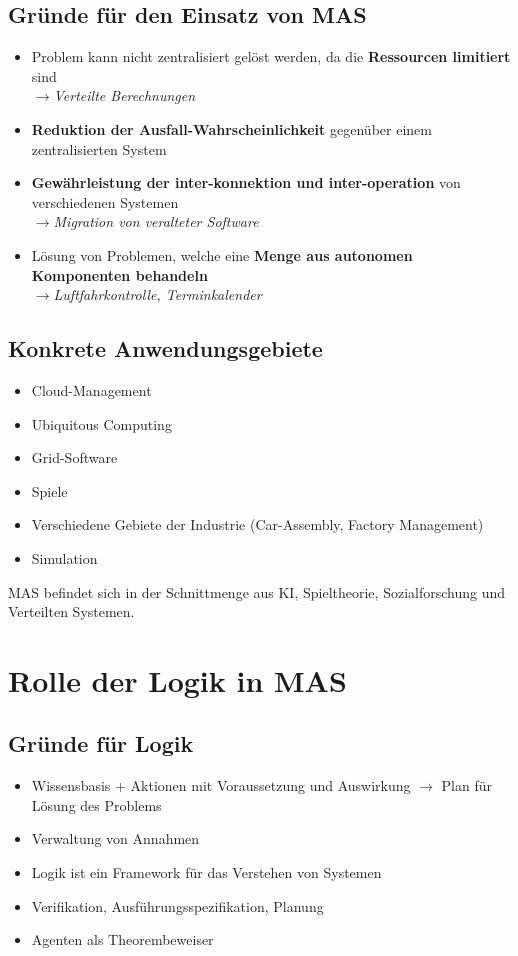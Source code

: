 \documentclass{article} %
\begin{document}
	\subsection{Gründe für den Einsatz von MAS}
	\begin{itemize}
		\item Problem kann nicht zentralisiert gelöst werden, da die \textbf{Ressourcen limitiert} sind\\
		$\rightarrow$\textit{Verteilte Berechnungen}
		\item \textbf{Reduktion der Ausfall-Wahrscheinlichkeit} gegenüber einem zentralisierten System
		\item \textbf{Gewährleistung der inter-konnektion und inter-operation} von verschiedenen Systemen\\
		$\rightarrow$\textit{Migration von veralteter Software}
		\item Lösung von Problemen, welche eine\textbf{ Menge aus autonomen Komponenten behandeln}\\
		$\rightarrow$\textit{Luftfahrkontrolle, Terminkalender}
	\end{itemize}
	\subsection{Konkrete Anwendungsgebiete}
	\begin{itemize}
		\item Cloud-Management
		\item Ubiquitous Computing
		\item Grid-Software
		\item Spiele
		\item Verschiedene Gebiete der Industrie (Car-Assembly, Factory Management)
		\item Simulation
	\end{itemize}
	MAS befindet sich in der Schnittmenge aus KI, Spieltheorie, Sozialforschung und Verteilten Systemen.
\section{Rolle der Logik in MAS}
	\subsection{Gründe für Logik}
	\begin{itemize}
		\item Wissensbasis + Aktionen mit Voraussetzung und Auswirkung $\rightarrow$ Plan für Lösung des Problems
		\item Verwaltung von Annahmen
		\item Logik ist ein Framework für das Verstehen von Systemen
		\item Verifikation, Ausführungsspezifikation, Planung
		\item Agenten als Theorembeweiser
	\end{itemize}
\end{document}
